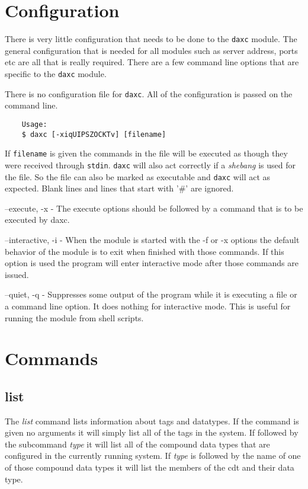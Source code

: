 	\section{Configuration}
	There is very little configuration that needs to be done to the \texttt{daxc}
	module.  The general configuration that is needed for all modules such as server
	address, ports etc are all that is really required.  There are a few command
	line options that are specific to the \texttt{daxc} module.
	
	There is no configuration file for \texttt{daxc}.  All of the configuration is
	passed on the command line.
	
	\begin{verbatim}
	Usage:
	$ daxc [-xiqUIPSZOCKTv] [filename]
	\end{verbatim}
	
	If \texttt{filename} is given the commands in the file will be executed as
	though
	they were received through \texttt{stdin}.  \texttt{daxc} will also act
	correctly if a \textit{shebang} is used for the file.  So the file can also be
	marked as executable and \texttt{daxc} will act as expected.  Blank lines and
	lines that start with '\#' are ignored.
	
	\begin{list}{}{daxc Command Line Options}
		\item[--execute, -x] - The execute options should be followed by a command
		that is to be executed by daxc.
		\item[--interactive, -i] - When the module is started with the -f or -x
		options the default behavior of the module is to exit when finished with those
		commands.  If this option is used the program will enter interactive mode after
		those commands are issued.
		\item[--quiet, -q] - Suppresses some output of the program while it is
		executing a file or a command line option.  It does nothing for interactive
		mode.  This is useful for running the module from shell scripts. 
	\end{list}
	
	\section{Commands}
	
	\subsection{list}
	The \textit{list} command lists information about tags and datatypes.  If the
	command is given no arguments it will simply list all of the tags in the system.
	If followed by the subcommand \textit{type} it will list all of the compound
	data types that are configured in the currently running system.  If
	\textit{type} is followed by the name of one of those compound data types it
	will list the members of the cdt and their data type.
	
